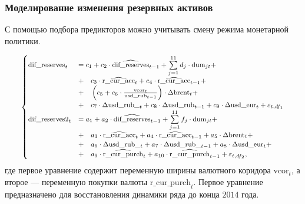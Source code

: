\documentclass[9pt]{beamer}
\newcommand{\lsum}{\sum\limits}
\begin{document}
\begin{frame}
	\frametitle{Моделирование изменения резервных активов}
	
	С помощью подбора предикторов можно учитывать смену режима монетарной политики.
	
\begin{align*}
\footnotesize
\begin{cases}
\text{dif\_reserves}_t &= c_1 + c_2 \cdot \widehat{\text{dif\_reserves}}_{t-1} + \lsum_{j = 1}^{11} d_j \cdot \text{dum}_{jt} + \\
& + \quad c_3 \cdot \widehat{\text{r\_cur\_acc}}_{t} + c_4 \cdot \widehat{\text{r\_cur\_acc}}_{t-1} + \\
& + \quad \left(c_5 + c_6 \cdot \frac{\text{vcor}_t}{\text{usd\_rub}_{t-1}}\right) \cdot \Delta \text{brent}_t + \\
&+ \quad c_7 \cdot \Delta \text{usd\_rub\_}_t + c_8 \cdot \Delta \text{usd\_rub}_{t-1} + c_9 \cdot \Delta \text{usd\_eur}_{t}+ \varepsilon_{t, df_{1}}\\ 
\text{dif\_reserves2}_t &= a_1 + a_2 \cdot \widehat{\text{dif\_reserves}}_{t-1} + \lsum_{j = 1}^{11} f_j \cdot \text{dum}_{jt} + \\
&+ \quad a_3 \cdot \widehat{\text{r\_cur\_acc}}_{t} + a_4 \cdot \widehat{\text{r\_cur\_acc}}_{t-1} + a_5 \cdot \Delta \text{brent}_t + \\
&+ \quad a_6 \cdot \Delta \text{usd\_rub\_}_t + a_7 \cdot \Delta \text{usd\_rub\_}_{t-1} + a_8 \cdot \Delta \text{usd\_eur}_{t} + \\
&+ \quad a_9 \cdot \widehat{\text{r\_cur\_purch}}_t +  a_{10} \cdot \widehat{\text{r\_cur\_purch}}_{t-1} + \varepsilon_{t, df_{2}}, \\ 
\end{cases}
\end{align*}		
	где первое уравнение содержит переменную ширины валютного коридора $\text{vcor}_t$, а второе —  переменную покупки валюты $\text{r\_cur\_purch}_t$.
	Первое уравнение предназначено для восстановления динамики ряда до конца $2014$ года.
\end{frame}
\end{document}
